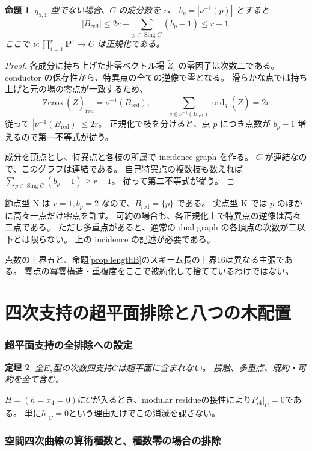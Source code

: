 \documentclass[11pt,a4paper]{ltjsarticle}
\newcommand{\PP}{\mathbf P}\renewcommand{\AA}{\mathbf A}
\newtheorem{theorem}{定理}[section]
\newtheorem{proposition}[theorem]{命題}
\theoremstyle{remark}\newtheorem{remark}[theorem]{注意}
\begin{document}
\begin{proposition}\label{prop:point-bound}
$q_{5,1}$ 型でない場合、$C$ の成分数を $r$、
$b_p=|\nu^{-1}(p)|$ とすると
\[
|B_{\mathrm{red}}|
\le2r-\sum_{p\in\operatorname{Sing}C}(b_p-1)
\le r+1.
\]
ここで $\nu:\coprod_{i=1}^r\PP^1\to C$ は正規化である。
\end{proposition}
\begin{proof}
各成分に持ち上げた非零ベクトル場 $\widetilde Z_i$ の零因子は次数二である。
conductor の保存性から、特異点の全ての逆像で零となる。
滑らかな点では持ち上げと元の場の零点が一致するため、
\[
\operatorname{Zeros}(\widetilde Z)_{\mathrm{red}}=\nu^{-1}(B_{\mathrm{red}}),
\qquad
\sum_{q\in\nu^{-1}(B_{\mathrm{red}})}\operatorname{ord}_q(\widetilde Z)=2r.
\]
従って $|\nu^{-1}(B_{\mathrm{red}})|\le2r$。
正規化で枝を分けると、点 $p$ につき点数が $b_p-1$ 増えるので第一不等式が従う。

成分を頂点とし、特異点と各枝の所属で incidence graph を作る。
$C$ が連結なので、このグラフは連結である。
自己特異点の複数枝も数えれば
$\sum_{p\in\operatorname{Sing}C}(b_p-1)\ge r-1$。
従って第二不等式が従う。
\end{proof}

節点型 N は $r=1,b_p=2$ なので、$B_{\mathrm{red}}=\{p\}$ である。
尖点型 K では $p$ のほかに高々一点だけ零点を許す。
可約の場合も、各正規化上で特異点の逆像は高々二点である。
ただし多重点があると、通常の dual graph の各頂点の次数が二以下とは限らない。
上の incidence の記述が必要である。

点数の上界五と、命題\ref{prop:lengthB}のスキーム長の上界16は異なる主張である。
零点の冪零構造・重複度をここで被約化して捨てているわけではない。


\part{四次支持の超平面排除と八つの木配置}
\section{超平面支持の全排除への設定}\label{sec:hyperplane-setting}
\begin{theorem}\label{thm:hyperplane}
全$\widetilde E_8$型の次数四支持$C$は超平面に含まれない。
接触、多重点、既約・可約を全て含む。
\end{theorem}
$H=(h=x_4=0)$に$C$が入るとき、modular residueの接性により$P_{i4}|_C=0$である。
単に$h|_C=0$という理由だけでこの消滅を課さない。


\section{空間四次曲線の算術種数と、種数零の場合の排除}\label{sec:space}
\end{document}
